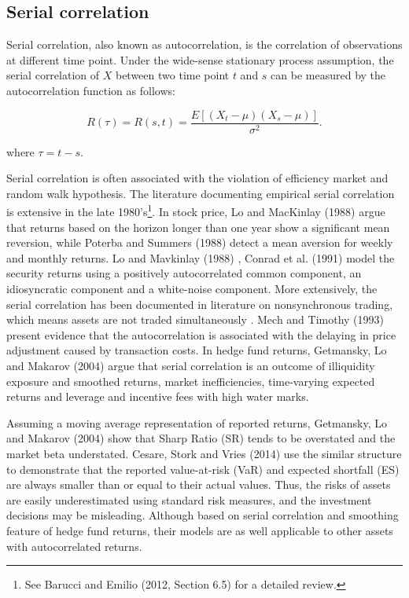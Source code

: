 \documentclass[11pt]{article}
\begin{document}
\subsection{Serial correlation}

Serial correlation, also known as autocorrelation, is the correlation of observations at different time point. Under the wide-sense stationary process assumption, the serial correlation of $X$ between two time point $t$ and $s$ can be measured by the autocorrelation function as follows:

\begin{equation}
R(\tau) = R(s, t) = \frac{E[(X_t-\mu)(X_s-\mu)]}{\sigma^2}.
\end{equation}

where $\tau = t-s$.

Serial correlation is often associated with the violation of efficiency market and random walk hypothesis. The literature documenting empirical serial correlation is extensive in the late 1980's\footnote{See Barucci and Emilio (2012, Section 6.5) \cite{barucci2012financial} for a detailed review.}. In stock price, Lo and MacKinlay (1988) \cite{lo1988stock} argue that returns based on the horizon longer than one year show a significant mean reversion, while Poterba and Summers (1988) \cite{poterba1988mean} detect a mean aversion for weekly and monthly returns. Lo and Mavkinlay (1988) \cite{lo1988stock}, Conrad et al. (1991) \cite{conrad1991components} model the security returns using a positively autocorrelated common component, an idiosyncratic component and a white-noise component. More extensively, the serial correlation has been documented in literature on nonsynchronous trading, which means assets are not traded simultaneously \cite{lo1990econometric}. Mech and Timothy (1993) \cite{mech1993portfolio} present evidence that the autocorrelation is associated with the delaying in price adjustment caused by transaction costs. In hedge fund returns, Getmansky, Lo and Makarov (2004) argue that serial correlation is an outcome of illiquidity exposure and smoothed returns, market inefficiencies, time-varying expected returns  and leverage and incentive fees with high water marks.

Assuming a moving average representation of reported returns, Getmansky, Lo and Makarov (2004) \cite{getmansky2004econometric} show that Sharp Ratio (SR) tends to be overstated and the market beta understated. Cesare, Stork and Vries (2014) \cite{di2014risk} use the similar structure to demonstrate that the reported value-at-risk (VaR) and expected shortfall (ES) are always smaller than or equal to their actual values. Thus, the risks of assets are easily underestimated using standard risk measures, and the investment decisions may be misleading. Although based on serial correlation and smoothing feature of hedge fund returns, their models are as well applicable to other assets with autocorrelated returns. 
\end{document}
